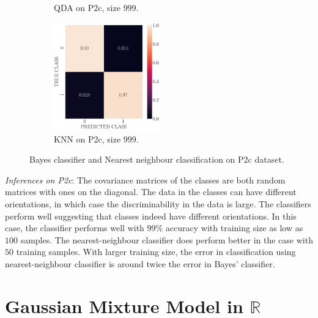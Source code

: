 \documentclass[11pt, a4 paper]{article}
\newcommand{\rr}{\mathbb{R}}
\begin{document}
\begin{figure}[!htbp]
\begin{subfigure}[!htbp]{0.24\textwidth}
       \caption{QDA on P2c, size $999$.}
       \label{fig:QDA_rr20_P2c_999}
    \end{subfigure}
\quad    
    \begin{subfigure}[!htbp]{0.24\textwidth}
       \centering
       \includegraphics[width=1.8in]{../results/ex2/conf_mtx_KNN_dataset_P2c_size_999.pdf}
       \caption{KNN on P2c, size $999$.}
       \label{fig:KNN_rr20_P2c_999}
    \end{subfigure}
\caption{Bayes classifier and Nearest neighbour classification on P2c dataset.}
\label{fig:ex2P2c}
\end{figure}
{\it Inferences on P2c}: The covariance matrices of the classes are both random matrices with ones on the diagonal. The data in the classes can have different orientations, in which case the discriminability in the data is large. The classifiers perform well suggesting that classes indeed have different orientations. In this case, the classifier performs well with $99\%$ accuracy with training size as low as $100$ samples. The nearest-neighbour classifier does perform better in the case with $50$ training samples. With larger training size, the error in classification using nearest-neighbour classifier is around twice the error in Bayes' classifier.


\section{Gaussian Mixture Model in $\rr$}
\label{sec:gmm}

\label{prob:3}
\end{document}

